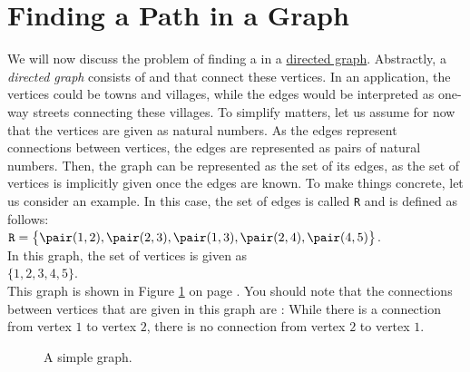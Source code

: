 \section{Finding a Path in a Graph}
We will now discuss the problem of finding a   in a
\href{https://en.wikipedia.org/wiki/Directed_graph}{directed graph}. 
Abstractly, a \emph{directed graph} consists of  and  that connect these vertices.  In an application, the
vertices could be towns and villages, while the edges would be interpreted as one-way streets connecting these
villages.  To simplify matters, let us assume for now that the vertices are given as natural numbers.  As the
edges represent connections between vertices,  the edges are represented as pairs of natural numbers.  Then,
the graph can be represented as the set of its edges, as the set of vertices is implicitly given once the edges
are known.  To make things concrete, let us consider an example.  In this case, the set of edges is called
\texttt{R} and is defined as follows:  
\\[0.2cm]
\hspace*{1.3cm}
$\texttt{R}\; \mathtt{=}\; \bigl\{ \pair(1,2), \pair(2,3), \pair(1,3), \pair(2,4), \pair(4,5) \bigr\}$.
\\[0.2cm]
In this graph, the set of vertices is given as
\\[0.2cm]
\hspace*{1.3cm}
$\{ 1, 2, 3, 4, 5 \}$.
\\[0.2cm]
This graph is shown in Figure \ref{fig:graph0} on page \pageref{fig:graph0}.  You should note that the
connections between vertices that are given in this graph are :  While there is a connection from
vertex $1$ to vertex $2$, there is no connection from vertex $2$ to vertex $1$.

 
\begin{figure}[!ht]
  \centering

  \caption{A simple graph.}
  \label{fig:graph0}
\end{figure}



